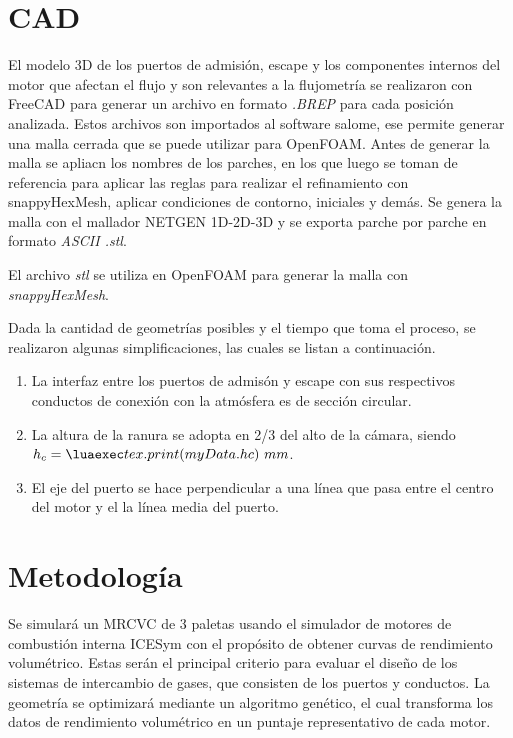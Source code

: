 \section{CAD}
%
El modelo 3D de los puertos de admisión, escape y los componentes internos del
motor que afectan el flujo y son relevantes a la flujometría se realizaron con
FreeCAD\cite{freecad} para generar un archivo en formato \emph{.BREP} para cada
posición analizada.
%
Estos archivos son importados al software salome\cite{salome}, ese permite
generar una malla cerrada que se puede utilizar para OpenFOAM. 
%
Antes de generar la malla se apliacn los nombres de los parches, en los que
luego se toman de referencia para aplicar las reglas para realizar el
refinamiento con snappyHexMesh, aplicar condiciones de contorno, iniciales y
demás.
%
Se genera la malla con el mallador NETGEN 1D-2D-3D y se exporta parche por
parche en formato \emph{ASCII .stl}.

%
El archivo \emph{stl} se utiliza en OpenFOAM para generar la malla con
\emph{snappyHexMesh}.

Dada la cantidad de geometrías posibles y el tiempo que toma el proceso, se
realizaron algunas simplificaciones, las cuales se listan a continuación.

%
\begin{enumerate}

    \item La interfaz entre los puertos de admisón y escape con sus respectivos
        conductos de conexión con la atmósfera es de sección circular.
    \item La altura de la ranura se adopta en 2/3 del alto de la cámara, siendo
        $h_c=\lua{tex.print(myData.hc)}\ mm$.
    \item El eje del puerto se hace perpendicular a una línea que pasa entre el
        centro del motor y el la línea media del puerto.

\end{enumerate}


\section{Metodología}
%
Se simulará un MRCVC de 3 paletas usando el simulador de motores de combustión
interna ICESym \cite{icesym} con el propósito de obtener curvas de rendimiento
volumétrico.
%
Estas serán el principal criterio para evaluar el diseño de los sistemas de
intercambio de gases, que consisten de los puertos y conductos.
%
La geometría se optimizará mediante un algoritmo genético, el cual transforma
los datos de rendimiento volumétrico en un puntaje representativo de cada
motor.


